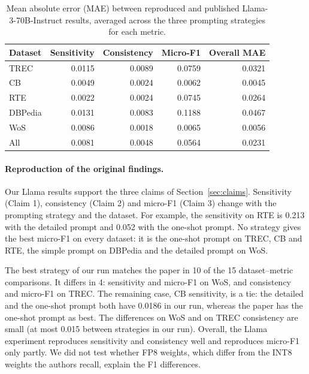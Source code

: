 \begin{table}[H]
\centering
\caption{Mean absolute error (MAE) between reproduced and published
Llama-3-70B-Instruct results, averaged across the three prompting strategies
for each metric.}
\label{tab:llama-mae}
\small
\begin{tabular}{lrrrr}
\toprule
Dataset & Sensitivity & Consistency & Micro-F1 & Overall MAE \\
\midrule
TREC    & 0.0115 & 0.0089 & 0.0759 & 0.0321 \\
CB      & 0.0049 & 0.0024 & 0.0062 & 0.0045 \\
RTE     & 0.0022 & 0.0024 & 0.0745 & 0.0264 \\
DBPedia & 0.0131 & 0.0083 & 0.1188 & 0.0467 \\
WoS     & 0.0086 & 0.0018 & 0.0065 & 0.0056 \\
\midrule
All     & 0.0081 & 0.0048 & 0.0564 & 0.0231 \\
\bottomrule
\end{tabular}
\end{table}

\paragraph{Reproduction of the original findings.}
\mbox{}\par

Our Llama results support the three claims of Section~\ref{sec:claims}.
Sensitivity (Claim 1), consistency (Claim 2) and micro-F1 (Claim 3) change
with the prompting strategy and the dataset. For example, the sensitivity on RTE is 0.213 with the detailed prompt and 0.052 with the one-shot prompt. No strategy gives the best micro-F1 on every dataset: it is the one-shot prompt on TREC, CB and RTE, the simple prompt on DBPedia and the detailed prompt on WoS.

The best strategy of our run matches the paper in 10 of the 15
dataset--metric comparisons. It differs in 4: sensitivity and micro-F1 on WoS, and consistency and micro-F1 on TREC. The remaining case, CB sensitivity, is a tie: the detailed and the one-shot prompt both have 0.0186 in our run, whereas the paper has the one-shot prompt as best. The differences on WoS and on TREC consistency are small (at most 0.015 between strategies in our run). Overall, the Llama experiment reproduces sensitivity and consistency well and reproduces micro-F1 only partly. We did not test whether FP8 weights, which differ from the INT8 weights the authors recall, explain the F1 differences.

